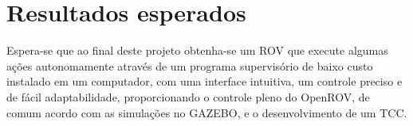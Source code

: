 \chapter{Resultados esperados}
Espera-se que ao final deste projeto obtenha-se um ROV que execute algumas ações autonomamente através de um programa supervisório de baixo custo instalado em um computador, com uma interface intuitiva, um controle preciso e de fácil adaptabilidade, proporcionando o controle pleno do OpenROV, de comum acordo com as simulações no GAZEBO, e o desenvolvimento de um TCC. 

